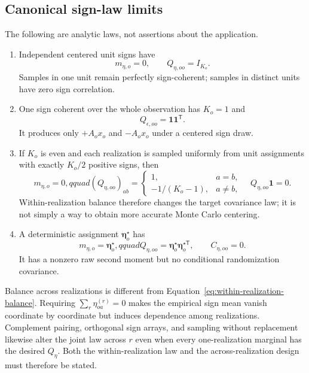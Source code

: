 \documentclass[11pt]{article}
\newcommand{\one}{\bm{1}}
\newcommand{\etaV}{\boldsymbol{\eta}}
\begin{document}
\subsection{Canonical sign-law limits}

The following are analytic laws, not assertions about the application.

\begin{enumerate}
\item Independent centered unit signs have
\begin{equation}
  m_{\eta,o}=0,\qquad Q_{\eta,oo}=I_{K_o}.
  \label{eq:independent-unit-law}
\end{equation}
Samples in one unit remain perfectly sign-coherent; samples in distinct units
have zero sign correlation.

\item One sign coherent over the whole observation has $K_o=1$ and
\begin{equation}
  Q_{\epsilon,oo}=\one\one^{\mathsf T}.
  \label{eq:global-coherent-law}
\end{equation}
It produces only $+A_ox_o$ and $-A_ox_o$ under a centered sign draw.

\item If $K_o$ is even and each realization is sampled uniformly from unit
assignments with exactly $K_o/2$ positive signs, then
\begin{equation}
  m_{\eta,o}=0,qquad
  (Q_{\eta,oo})_{ab}=
  \begin{cases}
    1,&a=b,\\
    -1/(K_o-1),&a\ne b,
  \end{cases}
  \quad
  Q_{\eta,oo}\one=0.
  \label{eq:within-realization-balance}
\end{equation}
Within-realization balance therefore changes the target covariance law; it is
not simply a way to obtain more accurate Monte Carlo centering.

\item A deterministic assignment $\etaV_o^\star$ has
\begin{equation}
  m_{\eta,o}=\etaV_o^\star,qquad
  Q_{\eta,oo}=\etaV_o^\star\etaV_o^{\star\mathsf T},
  \qquad C_{\eta,oo}=0.
  \label{eq:deterministic-sign-law}
\end{equation}
It has a nonzero raw second moment but no conditional randomization covariance.
\end{enumerate}

Balance across realizations is different from
Equation~\eqref{eq:within-realization-balance}.  Requiring
$\sum_r\eta_{oa}^{(r)}=0$ makes the empirical sign mean vanish coordinate by
coordinate but induces dependence among realizations.  Complement pairing,
orthogonal sign arrays, and sampling without replacement likewise alter the
joint law across $r$ even when every one-realization marginal has the desired
$Q_\eta$.  Both the within-realization law and the across-realization design
must therefore be stated.
\end{document}

